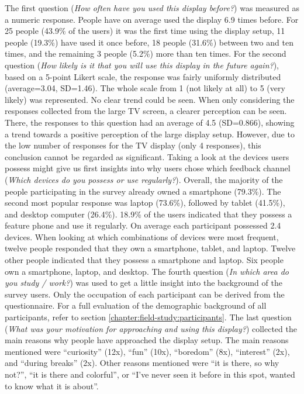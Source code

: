 	The first question (\textit{How often have you used this display before?}) was measured as a numeric response. People have on average used the display 6.9 times before. For 25 people (43.9\% of the users) it was the first time using the display setup, 11 people (19.3\%) have used it once before, 18 people (31.6\%) between two and ten times, and the remaining 3 people (5.2\%) more than ten times.
	For the second question (\textit{How likely is it that you will use this display in the future again?}), based on a 5-point Likert scale, the response was fairly uniformly distributed (average=3.04, SD=1.46). The whole scale from 1 (not likely at all) to 5 (very likely) was represented. No clear trend could be seen. When only considering the responses collected from the large TV screen, a clearer perception can be seen. There, the responses to this question had an average of 4.5 (SD=0.866), showing a trend towards a positive perception of the large display setup. However, due to the low number of responses for the TV display (only 4 responses), this conclusion cannot be regarded as significant. 
	Taking a look at the devices users possess might give us first insights into why users chose which feedback channel (\textit{Which devices do you possess or use regularly?}). Overall, the majority of the people participating in the survey already owned a smartphone (79.3\%). The second most popular response was laptop (73.6\%), followed by tablet (41.5\%), and desktop computer (26.4\%). 18.9\% of the users indicated that they possess a feature phone and use it regularly. On average each participant possessed 2.4 devices. 
	When looking at which combinations of devices were most frequent, twelve people responded that they own a smartphone, tablet, and laptop. Twelve other people indicated that they possess a smartphone and laptop. Six people own a smartphone, laptop, and desktop.
	The fourth question (\textit{In which area do you study / work?}) was used to get a little insight into the background of the survey users. Only the occupation of each participant can be derived from the questionnaire. For a full evaluation of the demographic background of all participants, refer to section \ref{chapter:field-study:participants}.
	The last question (\textit{What was your motivation for approaching and using this display?}) collected the main reasons why people have approached the display setup. The main reasons mentioned were ``curiosity'' (12x), ``fun'' (10x), ``boredom'' (8x), ``interest'' (2x), and ``during breaks'' (2x). Other reasons mentioned were ``it is there, so why not?'', ``it is there and colorful'', or ``I've never seen it before in this spot, wanted to know what it is about''.




